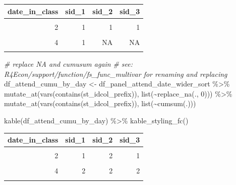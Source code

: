 \documentclass[
]{book}
\newenvironment{Shaded}{\begin{snugshade}}{\end{snugshade}}
\newcommand{\CommentTok}[1]{\textcolor[rgb]{0.56,0.35,0.01}{\textit{#1}}}
\newcommand{\DecValTok}[1]{\textcolor[rgb]{0.00,0.00,0.81}{#1}}
\newcommand{\FunctionTok}[1]{\textcolor[rgb]{0.00,0.00,0.00}{#1}}
\newcommand{\NormalTok}[1]{#1}
\newcommand{\OtherTok}[1]{\textcolor[rgb]{0.56,0.35,0.01}{#1}}
\newcommand{\SpecialCharTok}[1]{\textcolor[rgb]{0.00,0.00,0.00}{#1}}
\begin{document}
\begin{table}[!h]
\centering
\begin{tabular}{r|r|r|r}
\hline
date\_in\_class & sid\_1 & sid\_2 & sid\_3\\
\hline
\cellcolor{gray!6}{1} & \cellcolor{gray!6}{NA} & \cellcolor{gray!6}{1} & \cellcolor{gray!6}{NA}\\
\hline
2 & 1 & 1 & 1\\
\hline
\cellcolor{gray!6}{3} & \cellcolor{gray!6}{NA} & \cellcolor{gray!6}{NA} & \cellcolor{gray!6}{1}\\
\hline
4 & 1 & NA & NA\\
\hline
\cellcolor{gray!6}{5} & \cellcolor{gray!6}{NA} & \cellcolor{gray!6}{1} & \cellcolor{gray!6}{1}\\
\hline
\end{tabular}
\end{table}

\begin{Shaded}
\begin{Highlighting}[]
\CommentTok{\# replace NA and cumusum again}
\CommentTok{\# see: R4Econ/support/function/fs\_func\_multivar for renaming and replacing}
\NormalTok{df\_attend\_cumu\_by\_day }\OtherTok{\textless{}{-}}\NormalTok{ df\_panel\_attend\_date\_wider\_sort }\SpecialCharTok{\%\textgreater{}\%}
  \FunctionTok{mutate\_at}\NormalTok{(}\FunctionTok{vars}\NormalTok{(}\FunctionTok{contains}\NormalTok{(st\_idcol\_prefix)), }\FunctionTok{list}\NormalTok{(}\SpecialCharTok{\textasciitilde{}}\FunctionTok{replace\_na}\NormalTok{(., }\DecValTok{0}\NormalTok{))) }\SpecialCharTok{\%\textgreater{}\%}
  \FunctionTok{mutate\_at}\NormalTok{(}\FunctionTok{vars}\NormalTok{(}\FunctionTok{contains}\NormalTok{(st\_idcol\_prefix)), }\FunctionTok{list}\NormalTok{(}\SpecialCharTok{\textasciitilde{}}\FunctionTok{cumsum}\NormalTok{(.)))}

\FunctionTok{kable}\NormalTok{(df\_attend\_cumu\_by\_day) }\SpecialCharTok{\%\textgreater{}\%}
  \FunctionTok{kable\_styling\_fc}\NormalTok{()}
\end{Highlighting}
\end{Shaded}

\begin{table}[!h]
\centering
\begin{tabular}{r|r|r|r}
\hline
date\_in\_class & sid\_1 & sid\_2 & sid\_3\\
\hline
\cellcolor{gray!6}{1} & \cellcolor{gray!6}{0} & \cellcolor{gray!6}{1} & \cellcolor{gray!6}{0}\\
\hline
2 & 1 & 2 & 1\\
\hline
\cellcolor{gray!6}{3} & \cellcolor{gray!6}{1} & \cellcolor{gray!6}{2} & \cellcolor{gray!6}{2}\\
\hline
4 & 2 & 2 & 2\\
\hline
\cellcolor{gray!6}{5} & \cellcolor{gray!6}{2} & \cellcolor{gray!6}{3} & \cellcolor{gray!6}{3}\\
\hline
\end{tabular}
\end{table}
\end{document}
